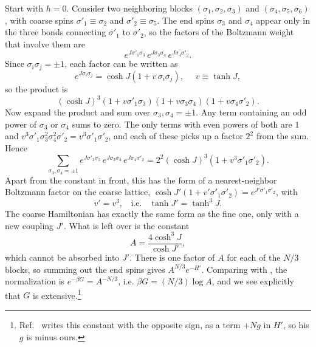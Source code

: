 Start with $h=0$. Consider two neighboring blocks $(\sigma_1,\sigma_2,\sigma_3)$ and
$(\sigma_4,\sigma_5,\sigma_6)$, with coarse spins $\sigma'_1\equiv\sigma_2$ and
$\sigma'_2\equiv\sigma_5$. The end spins $\sigma_3$ and $\sigma_4$ appear only in the
three bonds connecting $\sigma'_1$ to $\sigma'_2$, so the factors of the Boltzmann
weight that involve them are
\begin{equation}
  e^{J\sigma'_1\sigma_3}\,e^{J\sigma_3\sigma_4}\,e^{J\sigma_4\sigma'_2}.
\end{equation}
Since $\sigma_i\sigma_j=\pm1$, each factor can be written as
\begin{equation}
  e^{J\sigma_i\sigma_j}=\cosh J\left(1+v\,\sigma_i\sigma_j\right),~~~~~~
  v\equiv\tanh J,
\end{equation}
so the product is
\begin{equation}
  (\cosh J)^3\left(1+v\sigma'_1\sigma_3\right)\left(1+v\sigma_3\sigma_4\right)
  \left(1+v\sigma_4\sigma'_2\right).
\end{equation}
Now expand the product and sum over $\sigma_3,\sigma_4=\pm1$. Any term containing an
odd power of $\sigma_3$ or $\sigma_4$ sums to zero. The only terms with even powers of
both are $1$ and $v^3\sigma'_1\sigma_3^2\sigma_4^2\sigma'_2=v^3\sigma'_1\sigma'_2$,
and each of these picks up a factor $2^2$ from the sum. Hence
\begin{equation}
  \sum_{\sigma_3,\sigma_4=\pm1}e^{J\sigma'_1\sigma_3}\,e^{J\sigma_3\sigma_4}\,
  e^{J\sigma_4\sigma'_2}=2^2(\cosh J)^3\left(1+v^3\sigma'_1\sigma'_2\right).
\end{equation}
Apart from the constant in front, this has the form of a nearest-neighbor
Boltzmann factor on the coarse lattice, $\cosh J'(1+v'\sigma'_1\sigma'_2)
=e^{J'\sigma'_1\sigma'_2}$, with
\begin{equation}\label{eq:1dIsingRG}
  v'=v^3,~~~~\text{i.e.}~~~~\tanh J'=\tanh^3J.
\end{equation}
The coarse Hamiltonian has exactly the same form as the fine one, only with a
new coupling $J'$. What is left over is the constant
\begin{equation}
  A=\frac{4\cosh^3J}{\cosh J'},
\end{equation}
which cannot be absorbed into $J'$. There is one factor of $A$ for each of the
$N/3$ blocks, so summing out the end spins gives
$A^{N/3}e^{-H'}$. Comparing with , the
normalization is $e^{-\beta G}=A^{-N/3}$, i.e. $\beta G=(N/3)\log A$, and we see
explicitly that $G$ is extensive.\footnote{Ref.~\cite{cardy_scaling_1996}
writes this constant with the opposite sign, as a term $+Ng$ in $H'$, so his
$g$ is minus ours.}

